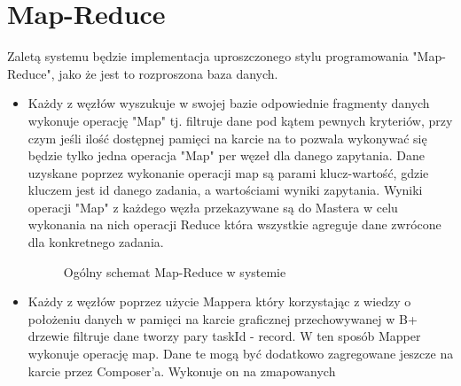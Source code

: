 \documentclass[paper=a4, fontsize=11pt]{scrartcl} %
\numberwithin{equation}{section} %
\numberwithin{figure}{section} %
\numberwithin{table}{section} %
\begin{document}
\section{Map-Reduce}
Zaletą systemu będzie implementacja uproszczonego stylu programowania "Map-Reduce", jako że jest to rozproszona baza danych.
\begin{itemize}
	\item Każdy z węzłów wyszukuje w swojej bazie odpowiednie fragmenty danych wykonuje operację "Map" tj. filtruje dane pod kątem pewnych 
		kryteriów, przy czym jeśli ilość dostępnej pamięci na karcie na to pozwala wykonywać się będzie tylko jedna operacja "Map" per węzeł dla danego zapytania.
		Dane uzyskane poprzez wykonanie operacji map są parami klucz-wartość, gdzie kluczem jest id danego zadania, a wartościami wyniki zapytania. Wyniki
		operacji "Map" z każdego węzła przekazywane są do Mastera w celu wykonania na nich operacji Reduce która wszystkie agreguje dane zwrócone dla konkretnego zadania. 
		\begin{figure}[t]
			\begin{center}
				\caption{Ogólny schemat Map-Reduce w systemie}
			\end{center}
		\end{figure}
	\item Każdy z węzłów poprzez użycie Mappera który korzystając z wiedzy o położeniu danych w pamięci na karcie graficznej przechowywanej w B+ drzewie filtruje dane tworzy
		pary taskId - record. W ten sposób Mapper wykonuje operację map. Dane te mogą być dodatkowo zagregowane jeszcze na karcie przez Composer'a. Wykonuje on na zmapowanych

\end{itemize}
\end{document}
